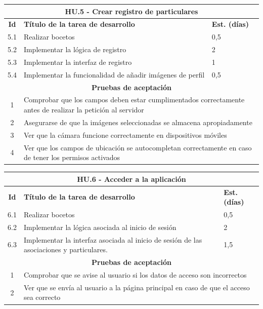 \begin{table}[H]
	\centering
\begin{tabular}{|c|p{9.5cm}|p{1cm}|}
	\hline
	\multicolumn{3}{|c|}{\textbf{HU.5 - Crear registro de particulares}} \\
	\hline
	\textbf{Id} & \textbf{Título de la tarea de desarrollo} & \textbf{Est. (días)} \\
	\hline
	5.1 & Realizar bocetos & 0,5 \\ \hline
	5.2 &  Implementar la lógica de registro & 2 \\ \hline
	5.3 &  Implementar la interfaz de registro & 1 \\ \hline
	5.4 &  Implementar la funcionalidad de añadir imágenes de perfil & 0,5 \\ \hline
	\multicolumn{3}{|c|}{\textbf{Pruebas de aceptación}} \\ \hline
	1 & \multicolumn{2}{|p{10cm}|}{Comprobar que los campos deben estar cumplimentados correctamente antes de realizar la petición al servidor} \\ \hline
	2 & \multicolumn{2}{|p{10cm}|}{Asegurarse de que la imágenes seleccionadas se almacena apropiadamente} \\ \hline
	3 & \multicolumn{2}{|p{10cm}|}{Ver que la cámara funcione correctamente en dispositivos móviles} \\ \hline
	4 & \multicolumn{2}{|p{10cm}|}{Ver que los campos de ubicación se autocompletan correctamente en caso de tener los permisos activados} \\ \hline
\end{tabular}
\end{table}

\begin{table}[H]
	\centering
\begin{tabular}{|c|p{9.5cm}|p{1cm}|}
	\hline
	\multicolumn{3}{|c|}{\textbf{HU.6 - Acceder a la aplicación}} \\
	\hline
	\textbf{Id} & \textbf{Título de la tarea de desarrollo} & \textbf{Est. (días)} \\
	\hline
		6.1 & Realizar bocetos & 0,5 \\ \hline
	6.2 &  Implementar la lógica asociada al inicio de sesión & 2 \\ \hline
	6.3 &  Implementar la interfaz asociada al inicio de sesión de las asociaciones y particulares. & 1,5 \\ \hline
	\multicolumn{3}{|c|}{\textbf{Pruebas de aceptación}} \\ \hline
	1 & \multicolumn{2}{|p{10cm}|}{Comprobar que se avise al usuario si los datos de acceso son incorrectos} \\ \hline
	2 & \multicolumn{2}{|p{10cm}|}{Ver que se envía al usuario a la página principal en caso de que el acceso sea correcto} \\ \hline
	
\end{tabular}
\end{table}

